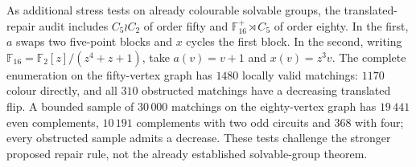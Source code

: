 \documentclass[11pt,a4paper]{article}
\theoremstyle{definition}
\theoremstyle{remark}
\begin{document}
As additional stress tests on already colourable solvable groups, the translated-repair audit includes $C_5\wr C_2$ of order fifty and $\mathbb F_{16}^{+}\rtimes C_5$ of order eighty.  In the first, $a$ swaps two five-point blocks and $x$ cycles the first block.  In the second, writing $\mathbb F_{16}=\mathbb F_2[z]/(z^4+z+1)$, take $a(v)=v+1$ and $x(v)=z^3v$.  The complete enumeration on the fifty-vertex graph has $1480$ locally valid matchings: $1170$ colour directly, and all $310$ obstructed matchings have a decreasing translated flip.  A bounded sample of $30\,000$ matchings on the eighty-vertex graph has $19\,441$ even complements, $10\,191$ complements with two odd circuits and $368$ with four; every obstructed sample admits a decrease.  These tests challenge the stronger proposed repair rule, not the already established solvable-group theorem.
\end{document}
